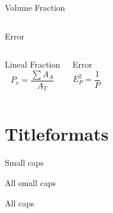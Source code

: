 \documentclass[10pt]{beamer}
\begin{document}
{\begin{frame}[fragile]{Volume Fraction}
\begin{columns}[T,onlytextwidth]
\begin{block}{Error}
\end{block}

\end{columns}

  \begin{columns}[T,onlytextwidth]
\begin{block}{Lineal Fraction}
\begin{equation*}
P_{v} = \dfrac{\sum A_{A}}{A_{T}}
\end{equation*} 
\end{block}
 

\begin{block}{Error}
\begin{equation*}
E_{P}^{2} = \dfrac{1}{P}
\end{equation*} 
\end{block}

\end{columns}


 
    
\end{frame}
}
\section{Titleformats}



{
\begin{frame}{Small caps}

\end{frame}
}

{
\begin{frame}{All small caps}

\end{frame}
}
{
\begin{frame}{All caps}

\end{frame}
}
\end{document}
